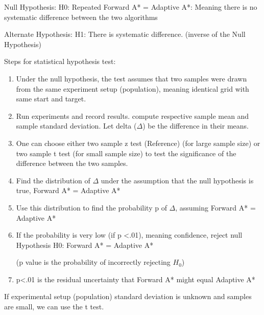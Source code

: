 \documentclass[12pt]{article}
\begin{document}
\vskip 0.5cm
\begin {flushleft}
Null Hypothesis: H0: Repeated Forward A* = Adaptive A*: Meaning there is no systematic difference between the two algorithms

Alternate Hypothesis: H1: There is systematic difference. (inverse of the Null Hypothesis)

Steps for statistical hypothesis test:
\end{flushleft}

\begin{enumerate}
   \item
	 \begin {flushleft}
	 Under the null hypothesis, the test assumes that two samples were drawn from the same experiment setup (population), meaning identical grid with same start and target.
	 \end{flushleft}
   \item
	 \begin {flushleft}
	 Run experiments and record results. compute respective sample mean and sample standard deviation. Let delta ($\Delta$) be the difference in their means. 
	 \end{flushleft}
    \item
	 \begin {flushleft}
	 One can choose either two sample z test (Reference) (for large sample size) or two sample t test (for small sample size) to test the significance of the difference between the two samples.
	  \end{flushleft}
	\item
	 \begin {flushleft}
Find the distribution of $\Delta$ under the assumption that the null hypothesis is true, 
Forward A* = Adaptive A*
	 \end{flushleft}
   \item
	 \begin {flushleft}
Use this distribution to find the probability p of $\Delta$, assuming Forward A* = Adaptive A*
	 \end{flushleft}
   \item
	 \begin {flushleft}
	 If the probability is very low (if p <.01), meaning  confidence,	  
reject null Hypothesis H0: Forward A* = Adaptive A*

(p value is the probability of incorrectly rejecting $H_0$)
	 \end{flushleft}
   \item
	 \begin {flushleft}
	 p<.01 is the residual uncertainty that Forward A* might equal Adaptive A*
	 \end{flushleft}
  \end{enumerate}
  If experimental setup (population) standard deviation is unknown and samples are small, we can use the t test.
  
\end{document}

